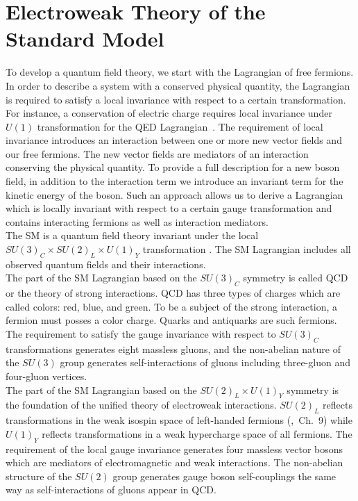 \section{Electroweak Theory of the Standard Model}
\label{sec:WgAbout_SMEWK}

To develop a quantum field theory, we start with the Lagrangian of free fermions. In order to describe a system with a conserved physical quantity, the Lagrangian is required to satisfy a local invariance with respect to a certain transformation. For instance, a conservation of electric charge requires local invariance under $U(1)$ transformation for the QED Lagrangian~\cite{ref_Pich}. The requirement of local invariance introduces an interaction between one or more new vector fields and our free fermions. The new vector fields are mediators of an interaction conserving the physical quantity. To provide a full description for a new boson field, in addition to the interaction term we introduce an invariant term for the kinetic energy of the boson. Such an approach allows us to derive a Lagrangian which is locally invariant with respect to a certain gauge transformation and contains interacting fermions as well as interaction mediators. \\ 

The SM is a quantum field theory invariant under the local $SU(3)_C \times SU(2)_L \times U(1)_Y$ transformation \cite{ref_Pich}. The SM Lagrangian includes all observed quantum fields and their interactions. \\ 

The part of the SM Lagrangian based on the $SU(3)_C$ symmetry is called QCD or the theory of strong interactions. QCD has three types of charges which are called colors: red, blue, and green. To be a subject of the strong interaction, a fermion must posses a color charge. Quarks and antiquarks are such fermions. The requirement to satisfy the gauge invariance with respect to $SU(3)_C$ transformations generates eight massless gluons, and the non-abelian nature of the $SU(3)$ group generates self-interactions of gluons including three-gluon and four-gluon vertices.\\

The part of the SM Lagrangian based on the $SU(2)_L \times U(1)_Y$ symmetry is the foundation of the unified theory of electroweak interactions. $SU(2)_L$ reflects transformations in the weak isospin space of left-handed fermions (\cite{ref_Griffiths},~Ch.~9) while $U(1)_Y$ reflects transformations in a weak hypercharge space of all fermions. The requirement of the local gauge invariance generates four massless vector bosons which are mediators of electromagnetic and weak interactions. The non-abelian structure of the $SU(2)$ group generates gauge boson self-couplings the same way as self-interactions of gluons appear in QCD.\\ 

